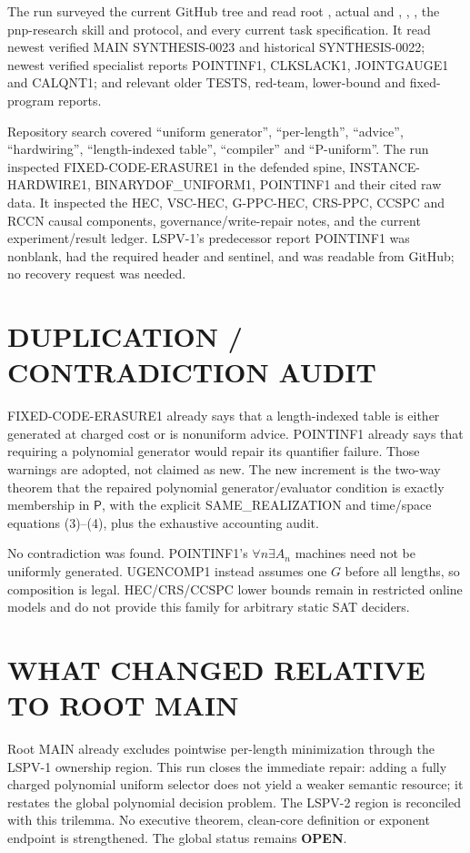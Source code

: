 \documentclass[11pt]{article}
\newcommand{\Pclass}{\mathsf{P}}
\newcommand{\OPEN}{\textbf{OPEN}}
\begin{document}
The run surveyed the current GitHub tree and read root , actual
 and , , , the
pnp-research skill and protocol, and every current task specification.  It
read newest verified MAIN SYNTHESIS-0023 and historical SYNTHESIS-0022; newest
verified specialist reports POINTINF1, CLKSLACK1, JOINTGAUGE1 and CALQNT1;
and relevant older TESTS, red-team, lower-bound and fixed-program reports.

Repository search covered ``uniform generator'', ``per-length'', ``advice'',
``hardwiring'', ``length-indexed table'', ``compiler'' and ``P-uniform''.
The run inspected FIXED-CODE-ERASURE1 in the defended  spine,
INSTANCE-HARDWIRE1, BINARYDOF\_UNIFORM1, POINTINF1 and their cited raw data.
It inspected the HEC, VSC-HEC, G-PPC-HEC, CRS-PPC, CCSPC and RCCN causal
components, governance/write-repair notes, and the current experiment/result
ledger.  LSPV-1's predecessor report POINTINF1 was nonblank, had the required
header and sentinel, and was readable from GitHub; no recovery request was
needed.

\section{DUPLICATION / CONTRADICTION AUDIT}

FIXED-CODE-ERASURE1 already says that a length-indexed table is either
generated at charged cost or is nonuniform advice.  POINTINF1 already says
that requiring a polynomial generator would repair its quantifier failure.
Those warnings are adopted, not claimed as new.  The new increment is the
two-way theorem that the repaired polynomial generator/evaluator condition is
exactly membership in \(\Pclass\), with the explicit SAME\_REALIZATION and
time/space equations (3)--(4), plus the exhaustive accounting audit.

No contradiction was found.  POINTINF1's \(\forall n\exists A_n\) machines
need not be uniformly generated.  UGENCOMP1 instead assumes one \(G\) before
all lengths, so composition is legal.  HEC/CRS/CCSPC lower bounds remain in
restricted online models and do not provide this family for arbitrary static
SAT deciders.

\section{WHAT CHANGED RELATIVE TO ROOT MAIN}

Root MAIN already excludes pointwise per-length minimization through the
LSPV-1 ownership region.  This run closes the immediate repair: adding a
fully charged polynomial uniform selector does not yield a weaker semantic
resource; it restates the global polynomial decision problem.  The LSPV-2
region is reconciled with this trilemma.  No executive theorem, clean-core
definition or exponent endpoint is strengthened.  The global status remains
\OPEN.
\end{document}
